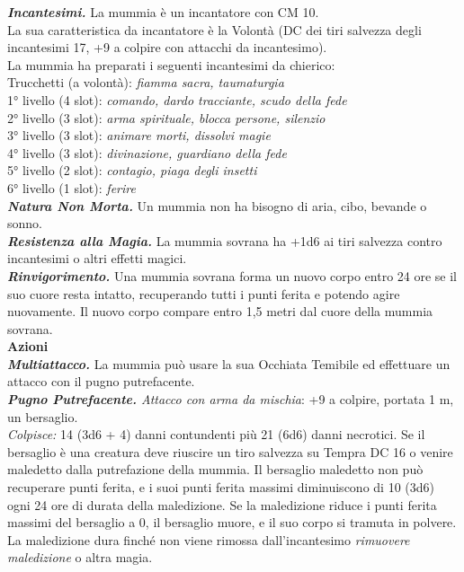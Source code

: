 \begin{multicols}{2}
\emph{\textbf{Incantesimi.}} La mummia è un incantatore con CM 10.\\
La sua caratteristica da incantatore è la Volontà (DC dei tiri salvezza degli incantesimi 17, +9 a colpire con attacchi da incantesimo).\\
La mummia ha preparati i seguenti incantesimi da chierico:\\
Trucchetti (a volontà): \emph{fiamma sacra, taumaturgia}\\
1° livello (4 slot): \emph{comando, dardo tracciante, scudo della fede}\\
2° livello (3 slot): \emph{arma spirituale, blocca persone, silenzio}\\
3° livello (3 slot): \emph{animare morti, dissolvi magie}\\
4° livello (3 slot): \emph{divinazione, guardiano della fede}\\
5° livello (2 slot): \emph{contagio, piaga degli insetti}\\
6° livello (1 slot): \emph{ferire}\\
\emph{\textbf{Natura Non Morta.}} Un mummia non ha bisogno di aria, cibo, bevande o sonno.\\
\emph{\textbf{Resistenza alla Magia.}} La mummia sovrana ha +1d6 ai tiri salvezza contro incantesimi o altri effetti magici.\\
\emph{\textbf{Rinvigorimento.}} Una mummia sovrana forma un nuovo corpo entro 24 ore se il suo cuore resta intatto, recuperando tutti i punti ferita e potendo agire nuovamente. Il nuovo corpo compare entro 1,5 metri dal cuore della mummia sovrana.\\
\smallskip\textbf{Azioni}\\
\emph{\textbf{Multiattacco.}} La mummia può usare la sua Occhiata Temibile ed effettuare un attacco con il pugno putrefacente.\\
\emph{\textbf{Pugno Putrefacente.} Attacco con arma da mischia}: +9 a colpire, portata 1 m, un bersaglio.\\
\emph{Colpisce:} 14 (3d6 + 4) danni contundenti più 21 (6d6) danni necrotici. Se il bersaglio è una creatura deve riuscire un tiro salvezza su Tempra DC 16 o venire maledetto dalla putrefazione della mummia. Il bersaglio maledetto non può recuperare punti ferita, e i suoi punti ferita massimi diminuiscono di 10 (3d6) ogni 24 ore di durata della maledizione. Se la maledizione riduce i punti ferita massimi del bersaglio a 0, il bersaglio muore, e il suo corpo si tramuta in polvere. La maledizione dura finché non viene rimossa dall'incantesimo \emph{rimuovere maledizione} o altra magia.\\


\end{multicols}

